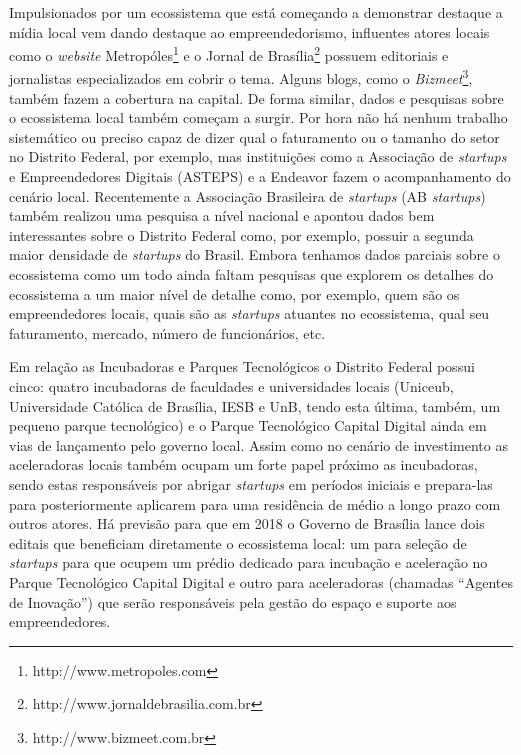 Impulsionados por um ecossistema que está começando a demonstrar destaque a mídia local vem dando destaque ao empreendedorismo, influentes atores locais como o \textit{website} Metropóles\footnote{http://www.metropoles.com} e o Jornal de Brasília\footnote{http://www.jornaldebrasilia.com.br} possuem editoriais e jornalistas especializados em cobrir o tema. Alguns blogs, como o \textit{Bizmeet}\footnote{http://www.bizmeet.com.br}, também fazem a cobertura na capital. De forma similar, dados e pesquisas sobre o ecossistema local também começam a surgir. Por hora não há nenhum trabalho sistemático ou preciso capaz de dizer qual o faturamento ou o tamanho do setor no Distrito Federal, por exemplo, mas instituições como a Associação de \textit{startups} e Empreendedores Digitais (ASTEPS) e a Endeavor fazem o acompanhamento do cenário local. Recentemente a Associação Brasileira de \textit{startups} (AB \textit{startups}) também realizou uma pesquisa a nível nacional e apontou dados bem interessantes sobre o Distrito Federal como, por exemplo, possuir a segunda maior densidade de \textit{startups} do Brasil. Embora tenhamos dados parciais sobre o ecossistema como um todo ainda faltam pesquisas que explorem os detalhes do ecossistema a um maior nível de detalhe como, por exemplo, quem são os empreendedores locais, quais são as \textit{startups} atuantes no ecossistema, qual seu faturamento, mercado, número de funcionários, etc.

Em relação as Incubadoras e Parques Tecnológicos o Distrito Federal possui cinco: quatro incubadoras de faculdades e universidades locais (Uniceub, Universidade Católica de Brasília, IESB e UnB, tendo esta última, também, um pequeno parque tecnológico) e o Parque Tecnológico Capital Digital ainda em vias de lançamento pelo governo local. Assim como no cenário de investimento as aceleradoras locais também ocupam um forte papel próximo as incubadoras, sendo estas responsáveis por abrigar \textit{startups} em períodos iniciais e prepara-las para posteriormente aplicarem para uma residência de médio a longo prazo com outros atores. Há previsão para que em 2018 o Governo de Brasília lance dois editais que beneficiam diretamente o ecossistema local: um para seleção de \textit{startups} para que ocupem um prédio dedicado para incubação e aceleração no Parque Tecnológico Capital Digital e outro para aceleradoras (chamadas ``Agentes de Inovação'') que serão responsáveis pela gestão do espaço e suporte aos empreendedores.

